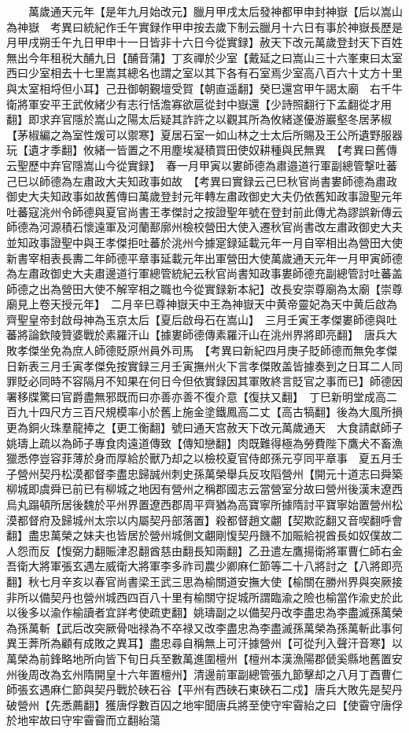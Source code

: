 　　萬歲通天元年【是年九月始改元】臘月甲戌太后發神都甲申封神嶽【后以嵩山為神嶽　考異曰統紀作壬午實録作甲申按去歲下制云臘月十六日有事於神嶽長歷是月甲戌朔壬午九日甲申十一日皆非十六日今從實録】赦天下改元萬歲登封天下百姓無出今年租税大酺九日【酺音蒲】丁亥禪於少室【戴延之曰嵩山三十六峯東曰太室西曰少室相去十七里嵩其總名也謂之室以其下各有石室焉少室高八百六十丈方十里與太室相埒但小耳】己丑御朝覲壇受賀【朝直遥翻】癸巳還宫甲午謁太廟　右千牛衛將軍安平王武攸緒少有志行恬澹寡欲扈從封中嶽還【少詩照翻行下孟翻從才用翻】即求弃官隱於嵩山之陽太后疑其詐許之以觀其所為攸緒遂優游巖壑冬居茅椒【茅椒編之為室性煖可以禦寒】夏居石室一如山林之士太后所賜及王公所遺野服器玩【遺才季翻】攸緒一皆置之不用塵埃凝積買田使奴耕種與民無異　【考異曰舊傳云聖歷中弃官隱嵩山今從實録】　春一月甲寅以婁師德為肅邉道行軍副總管撃吐蕃己巳以師德為左肅政大夫知政事如故　【考異曰實録云己巳秋官尚書婁師德為肅政御史大夫知政事如故舊傳曰萬歲登封元年轉左肅政御史大夫仍依舊知政事證聖元年吐蕃寇洮州令師德與夏官尚書王孝傑討之按證聖年號在登封前此傳尤為謬誤新傳云師德為河源積石懷遠軍及河蘭鄯廓州檢校營田大使入遷秋官尚書改左肅政御史大夫並知政事證聖中與王孝傑拒吐蕃於洮州今據寔録延載元年一月自宰相出為營田大使新書宰相表長夀二年師德平章事延載元年出軍營田大使萬歲通天元年一月甲寅師德為左肅政御史大夫肅邊道行軍總管統紀云秋官尚書知政事婁師德充副總管討吐蕃盖師德之出為營田大使不解宰相之職也今從實録新本紀】改長安崇尊廟為太廟【崇尊廟見上卷天授元年】　二月辛巳尊神嶽天中王為神嶽天中黄帝靈妃為天中黄后啟為齊聖皇帝封啟母神為玉京太后【夏后啟母石在嵩山】　三月壬寅王孝傑婁師德與吐蕃將論欽陵贊婆戰於素羅汗山【據婁師德傳素羅汗山在洮州界將即亮翻】　唐兵大敗孝傑坐免為庶人師德貶原州員外司馬　【考異曰新紀四月庚子貶師德而無免孝傑日新表三月壬寅孝傑免按實録三月壬寅撫州火下言孝傑敗盖皆據奏到之日耳二人同罪貶必同時不容隔月不知果在何日今但依實録因其軍敗終言貶官之事而已】師德因署移牒驚曰官爵盡無邪既而曰亦善亦善不復介意【復扶又翻】　丁巳新明堂成高二百九十四尺方三百尺規模率小於舊上施金塗鐵鳳高二丈【高古犒翻】後為大風所損更為銅火珠羣龍捧之【更工衡翻】號曰通天宫赦天下改元萬歲通天　大食請獻師子姚璹上疏以為師子專食肉遠道傳致【傳知戀翻】肉既難得極為勞費陛下鷹犬不畜漁獵悉停豈容菲薄於身而厚給於獸乃却之以檢校夏官侍郎孫元亨同平章事　夏五月壬子營州契丹松漠都督李盡忠歸誠州刺史孫萬榮舉兵反攻䧟營州【開元十道志曰舜築柳城即虞舜已前已有柳城之地因有營州之稱郡國志云當營室分故曰營州後漢末遼西烏丸蹋頓所居後魏於平州界置遼西郡周平齊猶為高寶寧所據隋討平寶寧始置營州松漠都督府及歸城州太宗以内屬契丹部落置】殺都督趙文翽【契欺訖翻又音喫翻呼會翻】盡忠萬榮之妹夫也皆居於營州城側文翽剛愎契丹饑不加賑給視酋長如奴僕故二人怨而反【愎弼力翻賑津忍翻酋慈由翻長知兩翻】乙丑遣左鷹揚衛將軍曹仁師右金吾衛大將軍張玄遇左威衛大將軍李多祚司農少卿麻仁節等二十八將討之【八將即亮翻】秋七月辛亥以春官尚書梁王武三思為榆關道安撫大使【榆關在勝州界與突厥接非所以備契丹也營州城西四百八十里有榆關守捉城所謂臨渝之險也榆當作渝史於此以後多以渝作榆讀者宜詳考使疏吏翻】姚璹副之以備契丹改李盡忠為李盡滅孫萬榮為孫萬斬【武后改突厥骨咄禄為不卒禄又改李盡忠為李盡滅孫萬榮為孫萬斬此事何異王莾所為顧有成敗之異耳】盡忠尋自稱無上可汗據營州【可從刋入聲汗音寒】以萬榮為前鋒略地所向皆下旬日兵至數萬進圍檀州【檀州本漢漁陽郡傂奚縣地舊置安州後周改為玄州隋開皇十六年置檀州】清邊前軍副總管張九節擊却之八月丁酉曹仁師張玄遇麻仁節與契丹戰於硤石谷【平州有西硤石東硤石二戍】唐兵大敗先是契丹破營州【先悉薦翻】獲唐俘數百囚之地牢聞唐兵將至使守牢霫紿之曰【使霫守唐俘於地牢故曰守牢霫霫而立翻紿蕩